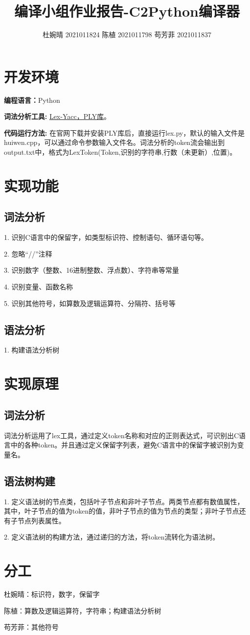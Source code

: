 \documentclass{article}
\begin{document}
\title{\textbf{编译小组作业报告-C2Python编译器}}
\author{杜婉晴 2021011824 陈植 2021011798 苟芳菲 2021011837}
\maketitle \thispagestyle{empty}
\section{开发环境}

\textbf{编程语言：}Python

\textbf{词法分析工具: }
\href{https://tastones.com/stackoverflow/python-language/python-lex-yacc/getting_started_with_ply/}{Lex-Yacc，PLY库}。

\textbf{代码运行方法: }在官网下载并安装PLY库后，直接运行lex.py，默认的输入文件是huiwen.cpp，可以通过命令参数输入文件名。词法分析的token流会输出到output.txt中，格式为LexToken(Token,识别的字符串,行数（未更新）,位置)。

\section{实现功能}
\subsection{词法分析}
1. 识别C语言中的保留字，如类型标识符、控制语句、循环语句等。

2. 忽略“//”注释

3. 识别数字（整数、16进制整数、浮点数）、字符串等常量

4. 识别变量、函数名称

5. 识别其他符号，如算数及逻辑运算符、分隔符、括号等

\subsection{语法分析}
1. 构建语法分析树


\section{实现原理}
\subsection{词法分析}
词法分析运用了lex工具，通过定义token名称和对应的正则表达式，可识别出C语言中的各种token。并且通过定义保留字列表，避免C语言中的保留字被识别为变量名。

\subsection{语法树构建}
1. 定义语法树的节点类，包括叶子节点和非叶子节点。两类节点都有数值属性，其中，叶子节点的值为token的值，非叶子节点的值为节点的类型；非叶子节点还有子节点列表属性。

2. 定义语法树的构建方法，通过递归的方法，将token流转化为语法树。


\section{分工}
杜婉晴：标识符，数字，保留字

陈植：算数及逻辑运算符，字符串；构建语法分析树

苟芳菲：其他符号
\end{document}
